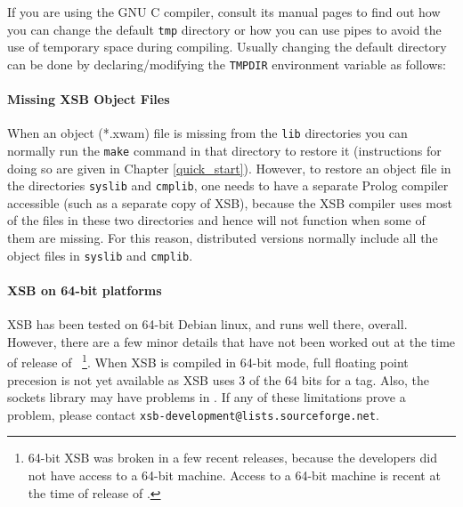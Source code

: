 \noindent
If you are using the GNU C compiler, consult its manual pages
to find out how you can change the default {\tt tmp} directory or how you
can use pipes to avoid the use of temporary space during compiling.
Usually changing the default directory can be done by declaring/modifying
the {\tt TMPDIR} environment variable as follows:


\paragraph*{Missing XSB Object Files}
When an object (*.xwam) file is missing from the {\tt lib} directories
you can normally run the {\tt make} command in that directory to
restore it (instructions for doing so are given in Chapter
\ref{quick_start}).  However, to restore an object file in the
directories {\tt syslib} and {\tt cmplib}, one needs to have a
separate Prolog compiler accessible (such as a separate copy of
XSB), because the XSB compiler uses most of the files in these
two directories and hence will not function when some of them are
missing.  For this reason, distributed versions normally include all
the object files in {\tt syslib} and {\tt cmplib}.

\paragraph*{XSB on 64-bit platforms}
%
XSB has been tested on 64-bit Debian linux, and runs well there,
overall.  However, there are a few minor details that have not been
worked out at the time of release of \version{}~\footnote{64-bit XSB
  was broken in a few recent releases, because the developers did not
  have access to a 64-bit machine.  Access to a 64-bit machine is
  recent at the time of release of \version{}.}.  When XSB is compiled
in 64-bit mode, full floating point precesion is not yet available as
XSB uses 3 of the 64 bits for a tag.  Also, the sockets library may
have problems in \version{}.  If any of these limitations prove a
problem, please contact {\tt xsb-development@lists.sourceforge.net}.

